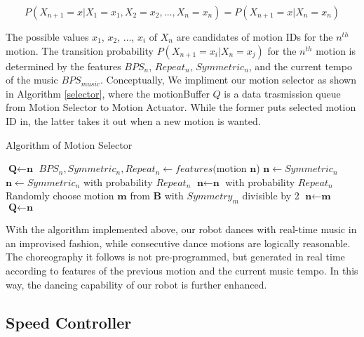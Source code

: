 \documentclass[UTF8,a4paper]{article}
\begin{document}
	\begin{equation}
		P(X_{n+1}=x|X_1=x_1, X_2=x_2, \ldots, X_n=x_n) = P(X_{n+1}=x|X_n=x_n)
	\end{equation}

	The possible values $x_1$, $x_2$, $\ldots$, $x_i$ of $X_n$ are candidates of motion IDs for the $n^{th}$ motion. The transition probability $P(X_{n+1}=x_i|X_n=x_j)$ for the $n^{th}$ motion is determined by the features $BPS_{n}$, $Repeat_{n}$, $Symmetric_{n}$, and the current tempo of the music $BPS_{music}$. Conceptually, We impliment our motion selector as shown in Algorithm \ref{selector}, where the motionBuffer $Q$ is a data trasmission queue from Motion Selector to Motion Actuator. While the former puts selected motion ID in, the latter takes it out when a new motion is wanted.

		\begin{algorithm}[!h]
			\caption{Algorithm of Motion Selector}
			\label{selector}
			$\textbf{Q}\leftarrow\textbf{n}$\;
			{
				{
					$BPS_n, Symmetric_n, Repeat_n \leftarrow features(\text{motion }\textbf{n}$)\;
					{
						$\textbf{n} \leftarrow Symmetric_n$\;
					}
					{
						$\textbf{n} \leftarrow Symmetric_n$ with probability $Repeat_n$\;
					}
					{
						$\textbf{n} \leftarrow \textbf{n}$ with probability $Repeat_n$\;
					}
					{
						Randomly choose motion $\textbf{m}$ from $\textbf{B}$ with $Symmetry_m$ divisible by 2\;
						$\textbf{n} \leftarrow \textbf{m}$\;
					}
					$\textbf{Q}\leftarrow\textbf{n}$\;
				}
			}
		\end{algorithm}

	With the algorithm implemented above, our robot dances with real-time music in an improvised fashion, while consecutive dance motions are logically reasonable. The choreography it follows is not pre-programmed, but generated in real time according to features of the previous motion and the current music tempo. In this way, the dancing capability of our robot is further enhanced.

	\subsection{Speed Controller}\label{speed}
\end{document}
